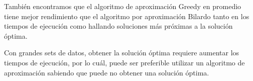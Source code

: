 \documentclass{estilo}
\begin{document}
También encontramos que el algoritmo de aproximación Greedy en promedio tiene mejor rendimiento que el algoritmo por aproximación Bilardo tanto en los tiempos de ejecución como hallando soluciones más próximas a la solución óptima.

Con grandes sets de datos, obtener la solución óptima requiere aumentar los tiempos de ejecución, por lo cuál, puede ser preferible utilizar un algoritmo de aproximación sabiendo que puede no obtener una solución óptima. 
\end{document}
